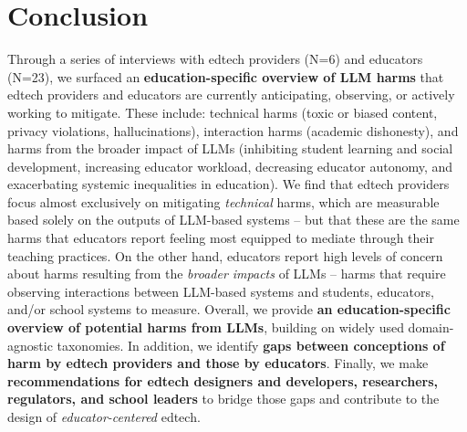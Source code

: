 \section{Conclusion}
Through a series of interviews with edtech providers (N=6) and educators (N=23), we surfaced an \textbf{education-specific overview of LLM harms} that edtech providers and educators are currently anticipating, observing, or actively working to mitigate. These include: technical harms (toxic or biased content, privacy violations, hallucinations), interaction harms (academic dishonesty), and harms from the broader impact of LLMs (inhibiting student learning and social development, increasing educator workload, decreasing educator autonomy, and exacerbating systemic inequalities in education). We find that edtech providers focus almost exclusively on mitigating \textit{technical} harms, which are measurable based solely on the outputs of LLM-based systems -- but that these are the same harms that educators report feeling most equipped to mediate through their teaching practices. On the other hand, educators report high levels of concern about harms resulting from the \textit{broader impacts} of LLMs -- harms that require observing interactions between LLM-based systems and students, educators, and/or school systems to measure. Overall, we provide \textbf{an education-specific overview of potential harms from LLMs}, building on widely used domain-agnostic taxonomies. In addition, we identify \textbf{gaps between conceptions of harm by edtech providers and those by educators}. Finally, we make \textbf{recommendations for edtech designers and developers, researchers, regulators, and school leaders} to bridge those gaps and contribute to the design of \textit{educator-centered} edtech. 



